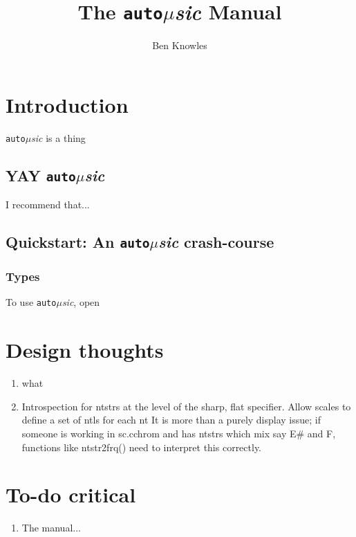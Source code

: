 \documentclass[12pt,letterpaper,titlepage]{article}
\newcommand{\automus}{\texttt{auto}{\large $\mu$}\textsl{sic}}
\begin{document}
\author{Ben Knowles}
\title{The \texttt{auto}{\Huge $\mu$}\textsl{sic} Manual}
\maketitle
\tableofcontents
\newpage



\section{Introduction}
\automus{} is a thing

\subsection{YAY \automus{}}
I recommend that...

\subsection{Quickstart: An \automus{} crash-course} \label{s:quickStart}
\subsubsection{Types}
To use \automus{}, open 



\section{Design thoughts}
\begin{enumerate}
\item what

\item Introspection for ntstrs at the level of the sharp, flat specifier.  
\subitem Allow scales to define a set of ntls for each nt
It is more than a purely display issue; if someone is working in sc.cchrom and has ntstrs which mix say E\# and F, functions like ntstr2frq() need to interpret this correctly.  

\end{enumerate}

\section{To-do critical}
\begin{enumerate}
\item The manual...
\end{enumerate}
\end{document}
